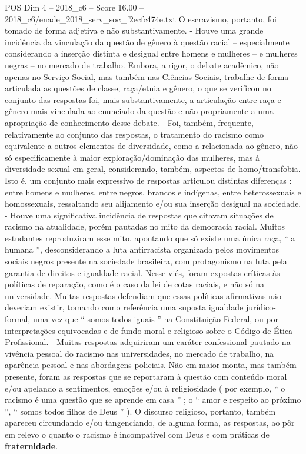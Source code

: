 \begin{textsample}{POS Dim 4 – 2018\_c6 – Score 16.00 – 2018\_c6/enade\_2018\_serv\_soc\_f2ecfc474e.txt}
O escravismo, portanto, foi tomado de forma adjetiva e não substantivamente. - Houve uma grande incidência da vinculação da questão de gênero à questão racial – especialmente considerando a inserção distinta e desigual entre homens e mulheres – e mulheres negras – no mercado de trabalho.
Embora, a rigor, o debate acadêmico, não apenas no Serviço Social, mas também nas Ciências Sociais, trabalhe de forma articulada as questões de classe, raça/etnia e gênero, o que se verificou no conjunto das respostas foi, mais substantivamente, a articulação entre raça e gênero mais vinculada ao enunciado da questão e não propriamente a uma apropriação de conhecimento desse debate. - Foi, também, frequente, relativamente ao conjunto das respostas, o tratamento do racismo como equivalente a outros elementos de diversidade, como a relacionada ao gênero, não só especificamente à maior exploração/dominação das mulheres, mas à diversidade sexual em geral, considerando, também, aspectos de homo/transfobia.
Isto é, um conjunto mais expressivo de respostas articulou distintas diferenças : entre homens e mulheres, entre negros, brancos e indígenas, entre heterossexuais e homossexuais, ressaltando seu alijamento e/ou sua inserção desigual na sociedade. - Houve uma significativa incidência de respostas que citavam situações de racismo na atualidade, porém pautadas no mito da democracia racial.
Muitos estudantes reproduziram esse mito, apontando que só existe uma única raça, “ a humana ”, desconsiderando a luta antirracista organizada pelos movimentos sociais negros presente na sociedade brasileira, com protagonismo na luta pela garantia de direitos e igualdade racial.
Nesse viés, foram expostas críticas às políticas de reparação, como é o caso da lei de cotas raciais, e não só na universidade.
Muitas respostas defendiam que essas políticas afirmativas não deveriam existir, tomando como referência uma suposta igualdade jurídico-formal, uma vez que “ somos todos iguais ” na Constituição Federal, ou por interpretações equivocadas e de fundo moral e religioso sobre o Código de Ética Profissional. - Muitas respostas adquiriram um caráter confessional pautado na vivência pessoal do racismo nas universidades, no mercado de trabalho, na aparência pessoal e nas abordagens policiais.
Não em maior monta, mas também presente, foram as respostas que se reportaram à questão com conteúdo moral e/ou apelando a sentimentos, emoções e/ou à religiosidade ( por exemplo, “ o racismo é uma questão que se aprende em casa ” ; o “ amor e respeito ao próximo ”, “ somos todos filhos de Deus ” ).
O discurso religioso, portanto, também apareceu circundando e/ou tangenciando, de alguma forma, as respostas, ao pôr em relevo o quanto o racismo é incompatível com Deus e com práticas de \textbf{fraternidade}.

\end{textsample}
